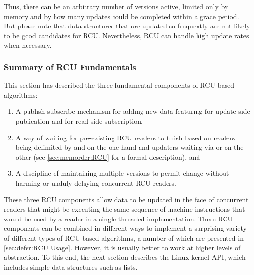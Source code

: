 {{	Thus, there can be an arbitrary number of versions active,
	limited only by memory and by how many updates could be completed
	within a grace period.
	But please note that data structures that are updated so frequently
	are not likely to be good candidates for RCU\@.
	Nevertheless, RCU can handle high update rates when necessary.
}\QuickQuizEndE
}

\subsubsection{Summary of RCU Fundamentals}
\label{sec:defer:Summary of RCU Fundamentals}

This section has described the three fundamental components of RCU-based
algorithms:

\begin{enumerate}
\item	A publish-subscribe mechanism for adding new data featuring
	 for update-side publication and
	 for read-side subscription,

\item	A way of waiting for pre-existing RCU readers to finish
	based on readers being delimited by 
	and  on the one hand and
	updaters waiting via  or
	 on the other
	(see \cref{sec:memorder:RCU} for a formal description),
	and

\item	A discipline of maintaining multiple versions to permit
	change without harming or unduly delaying concurrent RCU readers.
\end{enumerate}

\QuickQuizEnd

These three RCU components allow data to be updated in the face of concurrent
readers that might be executing the same sequence of machine instructions
that would be used by a reader in a single-threaded implementation.
These RCU components can be combined in different ways to implement a
surprising variety of different types of RCU-based algorithms, a number
of which are presented in
\cref{sec:defer:RCU Usage}.
However, it is usually better to work at higher levels of abstraction.
To this end, the next section describes the Linux-kernel API, which
includes simple data structures such as lists.
